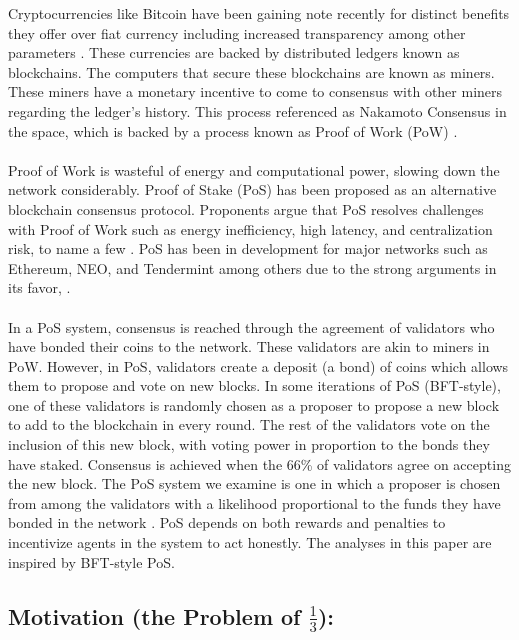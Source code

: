 \documentclass{article}
\renewcommand{\|}{\;|\;}
\begin{document}
Cryptocurrencies like Bitcoin have been gaining note recently for distinct benefits they offer over fiat currency including increased transparency among other parameters \cite{BitcoinFAQ}. These currencies are backed by distributed ledgers known as blockchains. The computers that secure these blockchains are known as miners. These miners have a monetary incentive to come to consensus with other miners regarding the ledger's history. This process referenced as Nakamoto Consensus in the space, which is backed by a process known as Proof of Work (PoW) \cite{Bitcoin.org}.\\ \\ Proof of Work is wasteful of energy and computational power, slowing down the network considerably. Proof of Stake (PoS) has been proposed as an alternative blockchain consensus protocol. Proponents argue that PoS resolves challenges with Proof of Work such as energy inefficiency, high latency, and centralization risk, to name a few \cite{EthPoSFAQ}. PoS has been in development for major networks such as Ethereum, NEO, and Tendermint among others due to the strong arguments in its favor,  \cite{EthPoSFAQ}. \\ \\ In a PoS system, consensus is reached through the agreement of validators who have bonded their coins to the network. These validators are akin to miners in PoW. However, in PoS, validators create a deposit (a bond) of coins which allows them to propose and vote on new blocks. In some iterations of PoS (BFT-style), one of these validators is randomly chosen as a proposer to propose a new block to add to the blockchain in every round\cite{EthPoSFAQ}. The rest of the validators vote on the inclusion of this new block, with voting power in proportion to the bonds they have staked. Consensus is achieved when the 66\% of validators agree on accepting the new block. \newline \newline The PoS system we examine is one in which a proposer is chosen from among the validators with a likelihood proportional to the funds they have bonded in the network \cite{EthPoSFAQ}. PoS depends on both rewards and penalties to incentivize agents in the system to act honestly. The analyses in this paper are inspired by BFT-style PoS.

\subsection*{Motivation (the Problem of $\frac{1}{3}$):}
\end{document}
